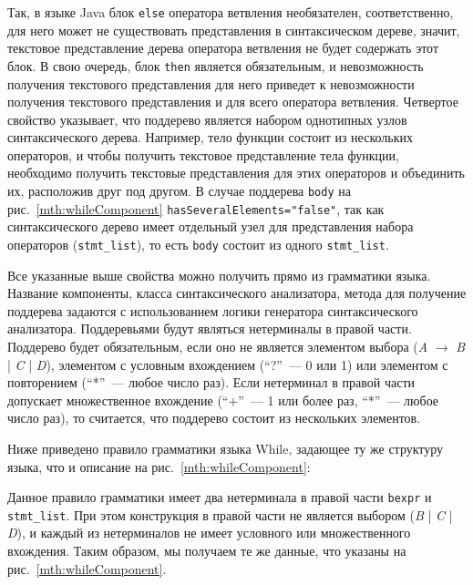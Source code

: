 Так, в языке Java блок \lstinline{else} оператора ветвления необязателен, соответственно, для него может не существовать представления в синтаксическом дереве, значит, текстовое представление дерева оператора ветвления не будет содержать этот блок. 
В свою очередь, блок \lstinline{then} является обязательным, и невозможность получения текстового представления для него приведет к невозможности получения текстового представления и для всего оператора ветвления.
Четвертое свойство указывает, что поддерево является набором однотипных узлов синтаксического дерева.
Например, тело функции состоит из нескольких операторов, и чтобы получить текстовое представление тела функции, необходимо получить текстовые представления для этих операторов и объединить их, расположив друг под другом.
В случае поддерева \lstinline{body} на рис.~\ref{mth:whileComponent} \lstinline{hasSeveralElements="false"}, так как синтаксического дерево имеет отдельный узел для представления набора операторов (\lstinline{stmt_list}), то есть \lstinline{body} состоит из одного \lstinline{stmt_list}.

Все указанные выше свойства можно получить прямо из грамматики языка.
\noindent
Название компоненты, класса синтаксического анализатора, метода для получение поддерева задаются с использованием логики генератора синтаксического анализатора.
Поддеревьями будут являться нетерминалы в правой части. %
Поддерево будет обязательным, если оно не является элементом выбора (\emph{A} $\rightarrow$ \emph{B} | \emph{C} | \emph{D}), элементом с условным вхождением (``?''~--- 0 или 1) или элементом с повторением (``*''~--- любое число раз).
Если нетерминал в правой части допускает множественное вхождение (``+''~--- 1 или более раз, ``*''~--- любое число раз), то считается, что поддерево состоит из нескольких элементов.

Ниже приведено правило грамматики языка While, задающее ту же структуру языка, что и описание на рис.~\ref{mth:whileComponent}:
{

}
\noindent
Данное правило грамматики имеет два нетерминала в правой части \lstinline{bexpr} и \lstinline{stmt_list}.
При этом конструкция в правой части не является выбором (\emph B | \emph C | \emph D), и каждый из нетерминалов не имеет условного или множественного вхождения.
Таким образом, мы получаем те же данные, что указаны на рис.~\ref{mth:whileComponent}.

